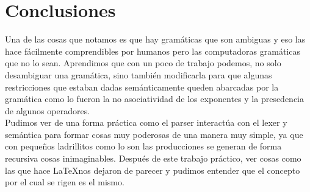 \section{Conclusiones}
Una de las cosas que notamos es que hay gramáticas que son ambiguas y eso las hace fácilmente comprendibles
por humanos pero las computadoras  gramáticas que no lo sean. Aprendimos que con un poco de trabajo
podemos, no solo desambiguar una gramática, sino también modificarla para que algunas restricciones que estaban dadas semánticamente
queden abarcadas por la gramática como lo fueron la no asociatividad de los exponentes y la presedencia de algunos operadores. \\

Pudimos ver de una forma práctica como el parser interactúa con el lexer y semántica para formar cosas muy poderosas de una
manera muy simple, ya que con pequeños ladrillitos como lo son las producciones se generan de forma recursiva cosas inimaginables.
Después de este trabajo práctico, ver cosas como las que hace \LaTeX nos dejaron de parecer  y pudimos entender
que el concepto por el cual se rigen es el mismo. \\